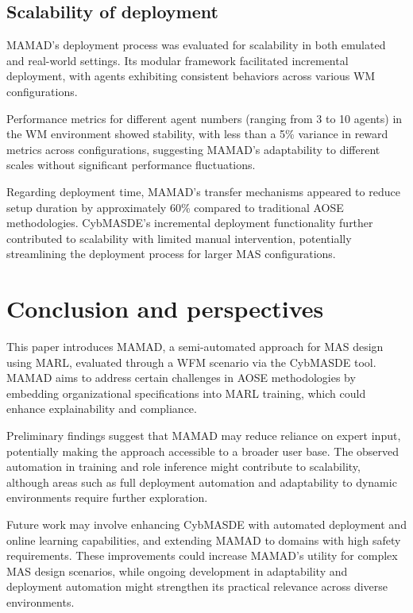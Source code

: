 \documentclass[pdflatex,sn-mathphys-num]{sn-jnl}%
\theoremstyle{thmstyleone}%
\theoremstyle{thmstyletwo}%
\theoremstyle{thmstylethree}%
\begin{document}
\subsection{Scalability of deployment}

MAMAD's deployment process was evaluated for scalability in both emulated and real-world settings. Its modular framework facilitated incremental deployment, with agents exhibiting consistent behaviors across various WM configurations.

Performance metrics for different agent numbers (ranging from 3 to 10 agents) in the WM environment showed stability, with less than a 5\% variance in reward metrics across configurations, suggesting MAMAD's adaptability to different scales without significant performance fluctuations.

Regarding deployment time, MAMAD's transfer mechanisms appeared to reduce setup duration by approximately 60\% compared to traditional AOSE methodologies. CybMASDE's incremental deployment functionality further contributed to scalability with limited manual intervention, potentially streamlining the deployment process for larger MAS configurations.


\section{Conclusion and perspectives}\label{sec:conclusion}

This paper introduces MAMAD, a semi-automated approach for MAS design using MARL, evaluated through a WFM scenario via the CybMASDE tool. MAMAD aims to address certain challenges in AOSE methodologies by embedding organizational specifications into MARL training, which could enhance explainability and compliance.

Preliminary findings suggest that MAMAD may reduce reliance on expert input, potentially making the approach accessible to a broader user base. The observed automation in training and role inference might contribute to scalability, although areas such as full deployment automation and adaptability to dynamic environments require further exploration.

Future work may involve enhancing CybMASDE with automated deployment and online learning capabilities, and extending MAMAD to domains with high safety requirements. These improvements could increase MAMAD's utility for complex MAS design scenarios, while ongoing development in adaptability and deployment automation might strengthen its practical relevance across diverse environments.
\end{document}
